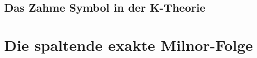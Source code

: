 \documentclass[ngerman,fontsize=11pt, paper=a4, parskip=half, titlepage=true, toc=bib]{scrartcl}
\begin{document}
\subsection{Das Zahme Symbol in der K-Theorie}
\begin{Satz}\end{Satz}


\section{Die spaltende exakte Milnor-Folge}
\cite[][Theorem 2.3]{milnor}

\printindex

\nocite{*}
\printbibliography
\end{document}
